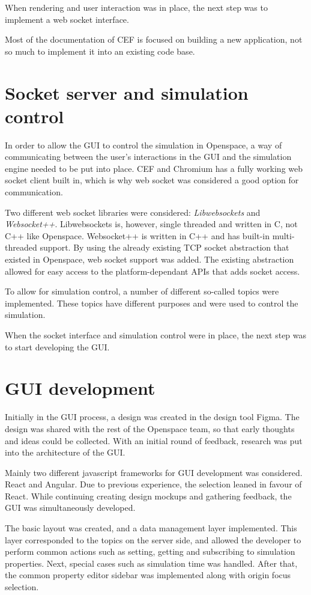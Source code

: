 When rendering and user interaction was in place, the next step was to implement a web socket interface.

Most of the documentation of CEF is focused on building a new application, not so much to implement it into an existing code base. 

\section{Socket server and simulation control}

In order to allow the GUI to control the simulation in Openspace, a way of communicating between the user's interactions in the GUI and the simulation engine needed to be put into place. CEF and Chromium has a fully working web socket client built in, which is why web socket was considered a good option for communication.

Two different web socket libraries were considered: \emph{Libwebsockets} and \emph{Websocket++}. Libwebsockets is, however, single threaded and written in C, not C++ like Openspace. \cite{lwssingle} Websocket++ is written in C++ and has built-in multi-threaded support. By using the already existing TCP socket abstraction that existed in Openspace, web socket support was added. The existing abstraction allowed for easy access to the platform-dependant APIs that adds socket access.

To allow for simulation control, a number of different so-called topics were implemented. These topics have different purposes and were used to control the simulation.

When the socket interface and simulation control were in place, the next step was to start developing the GUI.

\section{GUI development}

Initially in the GUI process, a design was created in the design tool Figma. The design was shared with the rest of the Openspace team, so that early thoughts and ideas could be collected. With an initial round of feedback, research was put into the architecture of the GUI.

Mainly two different javascript frameworks for GUI development was considered. React and Angular.  Due to previous experience, the selection leaned in favour of React. While continuing creating design mockups and gathering feedback, the GUI was simultaneously developed.

The basic layout was created, and a data management layer implemented. This layer corresponded to the topics on the server side, and allowed the developer to perform common actions such as setting, getting and subscribing to simulation properties. Next, special cases such as simulation time was handled. After that, the common property editor sidebar was implemented along with origin focus selection. 

